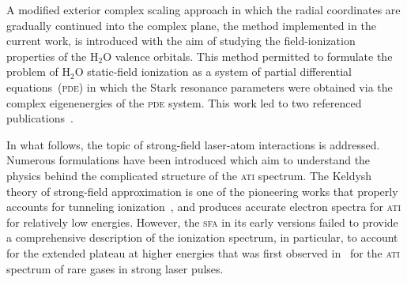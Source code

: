 
A modified exterior complex scaling approach in which the radial
coordinates are gradually continued into the complex plane, the method
implemented in the current work, is introduced with the aim of
studying the field-ionization properties of the H$_{2}$O valence
orbitals. This method permitted to formulate the problem of H$_{2}$O
static-field ionization as a system of partial differential
equations~(\textsc{pde}) in which the Stark resonance parameters were
obtained via the complex eigenenergies of the \textsc{pde}
system. This work led to two referenced
publications~\cite{sarias_2016,sarias_2017}.






In what follows, the topic of strong-field laser-atom interactions is
addressed. Numerous formulations have been introduced which aim to
understand the physics behind the complicated structure of the
\textsc{ati} spectrum.  The Keldysh theory of strong-field
approximation is one of the pioneering works that properly accounts
for tunneling ionization~\cite{KeldyshSFA}, and produces accurate
electron spectra for \textsc{ati} for relatively low
energies. However, the \textsc{sfa} in its early versions failed to
provide a comprehensive description of the ionization spectrum, in
particular, to account for the extended plateau at higher energies
that was first observed in~\cite{Paulus_1994plateau} for the
\textsc{ati} spectrum of rare gases in strong laser pulses.

